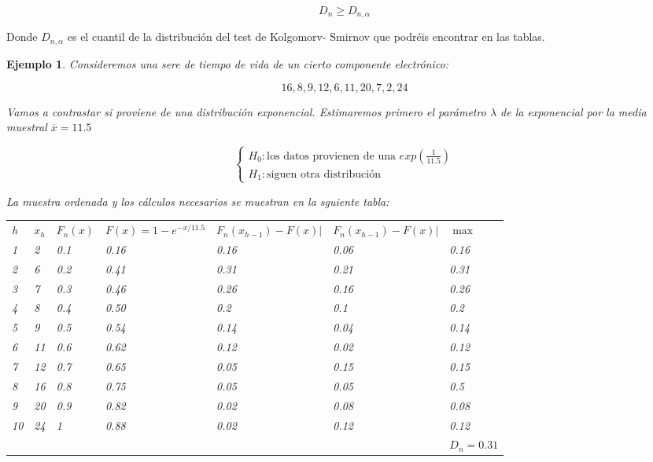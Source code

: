 \documentclass[12pt]{report}
\newtheorem{example}[definition]{Ejemplo}
\begin{document}
$$D_n\geq D_{n,\alpha}$$


Donde $D_{n,\alpha}$ es el cuantil de la distribución del test de Kolgomorv- Smirnov que podréis encontrar en las tablas.
           
          
           \begin{example}
           Consideremos una sere de tiempo de vida  de un cierto componente electrónico:
           
           $$16,8,9,12,6,11,20,7,2,24$$
           
           Vamos a contrastar si proviene de una distribución exponencial. Estimaremos primero el parámetro $\lambda$ de la exponencial por la media muestral $\overline{x}=11.5$

$$\left\{\begin{array}{ll}H_0: \mbox{los datos provienen de una } exp(\frac{1}{11.5})\\
H_1: \mbox{siguen otra distribución}\end{array}\right.
$$
          
           
           La muestra ordenada  y los cálculos necesarios se muestran en la sguiente tabla:
           
              
           
           \begin{tabular}{lllllll}
           h & $x_h$ & $F_n(x)$ & $F(x)=1- e ^{-x/11.5}$& $F_n(x_{h-1})-F(x)| $& $F_n(x_{h-1})-F(x)| $& $\max$ \\
           1 & 2  & 0.1 & 0.16 & 0.16 & 0.06 & 0.16\\ 
           2 & 6  & 0.2 & 0.41 & 0.31 & 0.21 & 0.31\\
           3 & 7  & 0.3 & 0.46 & 0.26 & 0.16 & 0.26\\
           4 & 8   & 0.4 & 0.50 & 0.2 & 0.1 & 0.2\\
           5 & 9  & 0.5  & 0.54 & 0.14 & 0.04 & 0.14\\
           6 & 11 & 0.6 & 0.62 & 0.12 & 0.02 &0.12\\
           7 & 12 & 0.7 & 0.65&0.05& 0.15& 0.15\\
           8 & 16 & 0.8 & 0.75& 0.05& 0.05 & 0.5\\
           9 & 20 & 0.9 & 0.82&0.02 & 0.08 &  0.08\\
           10 & 24 & 1 & 0.88& 0.02 & 0.12 & 0.12\\
           & & & & &  &$ D_n=0.31$\\
           \end{tabular}
           
         \end{example}   
         
\end{document}
